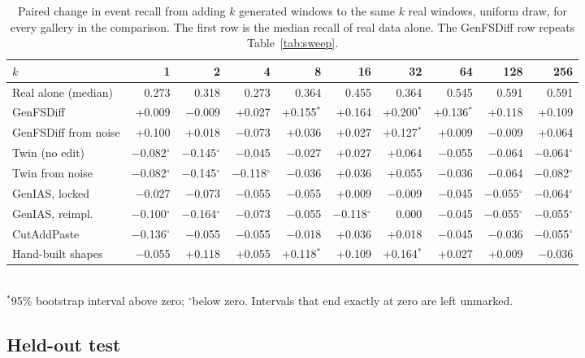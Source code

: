 \documentclass[11pt,a4paper]{article}
\begin{document}
\begin{table}[t]
\centering
\caption{Paired change in event recall from adding $k$ generated windows to
the same $k$ real windows, uniform draw, for every gallery in the comparison.
The first row is the median recall of real data alone. The GenFSDiff row
repeats Table~\ref{tab:sweep}.}
\label{tab:sweep-all}
\small
\setlength{\tabcolsep}{2.4pt}
\begin{tabular}{@{}lrrrrrrrrr@{}}
\toprule
$k$ & 1 & 2 & 4 & 8 & 16 & 32 & 64 & 128 & 256 \\
\midrule
Real alone (median) & 0.273 & 0.318 & 0.273 & 0.364 & 0.455 & 0.364 & 0.545 & 0.591 & 0.591 \\
\midrule
GenFSDiff & +0.009 & $-$0.009 & +0.027 & +0.155$^{\ast}$ & +0.164 & +0.200$^{\ast}$ & +0.136$^{\ast}$ & +0.118 & +0.109 \\
GenFSDiff from noise & +0.100 & +0.018 & $-$0.073 & +0.036 & +0.027 & +0.127$^{\ast}$ & +0.009 & $-$0.009 & +0.064 \\
Twin (no edit) & $-$0.082$^{\circ}$ & $-$0.145$^{\circ}$ & $-$0.045 & $-$0.027 & +0.027 & +0.064 & $-$0.055 & $-$0.064 & $-$0.064$^{\circ}$ \\
Twin from noise & $-$0.082$^{\circ}$ & $-$0.145$^{\circ}$ & $-$0.118$^{\circ}$ & $-$0.036 & +0.036 & +0.055 & $-$0.036 & $-$0.064 & $-$0.082$^{\circ}$ \\
\midrule
GenIAS, locked & $-$0.027 & $-$0.073 & $-$0.055 & $-$0.055 & +0.009 & $-$0.009 & $-$0.045 & $-$0.055$^{\circ}$ & $-$0.064$^{\circ}$ \\
GenIAS, reimpl. & $-$0.100$^{\circ}$ & $-$0.164$^{\circ}$ & $-$0.073 & $-$0.055 & $-$0.118$^{\circ}$ & 0.000 & $-$0.045 & $-$0.055$^{\circ}$ & $-$0.055$^{\circ}$ \\
CutAddPaste & $-$0.136$^{\circ}$ & $-$0.055 & $-$0.055 & $-$0.018 & +0.036 & +0.018 & $-$0.045 & $-$0.036 & $-$0.055$^{\circ}$ \\
Hand-built shapes & $-$0.055 & +0.118 & +0.055 & +0.118$^{\ast}$ & +0.109 & +0.164$^{\ast}$ & +0.027 & +0.009 & $-$0.036 \\
\bottomrule
\end{tabular}\\[0.3em]
{\footnotesize $^{\ast}$95\% bootstrap interval above zero; $^{\circ}$below
zero. Intervals that end exactly at zero are left unmarked.}
\end{table}

\subsection{Held-out test}
\label{sec:sealed}
\end{document}
